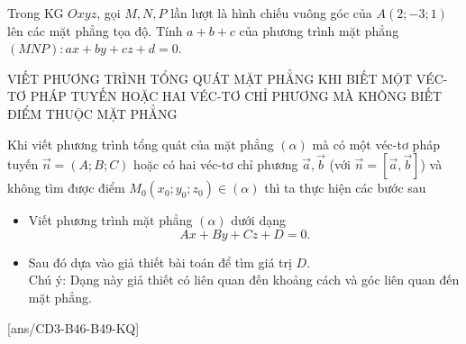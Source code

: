 \begin{ex}%
	Trong KG $Oxyz$, gọi $M, N, P$ lần lượt là hình chiếu vuông góc của $A(2 ;-3 ; 1)$ lên các mặt phẳng tọa độ. Tính $a+b+c$ của phương trình mặt phẳng $(MNP)\colon ax+by+cz+d=0$. 
\end{ex}
\begin{dang}{VIẾT PHƯƠNG TRÌNH TỔNG QUÁT MẶT PHẲNG KHI BIẾT MỘT VÉC-TƠ PHÁP TUYẾN HOẶC HAI VÉC-TƠ CHỈ PHƯƠNG MÀ KHÔNG BIẾT ĐIỂM THUỘC MẶT PHẲNG}
\end{dang}
\begin{tomtat}
	Khi viết phương trình tổng quát của mặt phẳng $(\alpha)$ mà có một véc-tơ pháp tuyến $\overrightarrow{n}=(A ; B ; C)$ hoặc có hai véc-tơ chỉ phương $\overrightarrow{a}, \overrightarrow{b}$ (với $\overrightarrow{n}=\left[\overrightarrow{a}, \overrightarrow{b}\right]$) và không tìm được điểm $M_0\left(x_0 ; y_0 ; z_0\right) \in(\alpha)$ thì ta thực hiện các bước sau
	\begin{itemize}
		\item Viết phương trình mặt phẳng $(\alpha)$ dưới dạng
		$$
		Ax+By+Cz+D=0
		.$$
		\item Sau đó dựa vào giả thiết bài toán để tìm giá trị $D$.\\
		Chú ý: Dạng này giả thiết có liên quan đến khoảng cách và góc liên quan đến mặt phẳng.
	\end{itemize}
\end{tomtat}
[ans/CD3-B46-B49-KQ]
\TN
